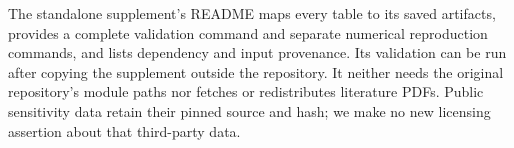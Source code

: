 The standalone supplement's README maps every table to its saved artifacts,
provides a complete validation command and separate numerical reproduction
commands, and lists dependency and input provenance. Its validation can be
run after copying the supplement outside the repository. It neither needs
the original repository's module paths nor fetches or redistributes literature
PDFs. Public sensitivity data retain their pinned source and hash; we make no
new licensing assertion about that third-party data.

